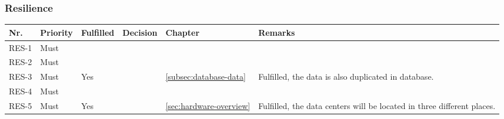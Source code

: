 	\subsubsection{Resilience}
	\begin{table}[H]
	\begin{tabular}{lllllL{}}
	
	Nr.   & Priority & Fulfilled & Decision & Chapter & Remarks \\ \hline
	
	
	RES-1 & Must     & ~        & ~ & ~         & ~       \\ \hline
	
	
	RES-2 & Must     & ~        & ~ & ~        & ~       \\ \hline
	
	RES-3 & Must     & Yes      & ~ & \ref{subsec:database-data}         & Fulfilled, the data is also duplicated in database.       \\ \hline
	
	RES-4 & Must     & ~        & ~ & ~         & ~       \\ \hline
	
	RES-5 & Must     & Yes      & ~ & \ref{sec:hardware-overview}         & Fulfilled, the data centers will be located in three different places.       \\ \hline
	
	\end{tabular}
	\end{table}
	
